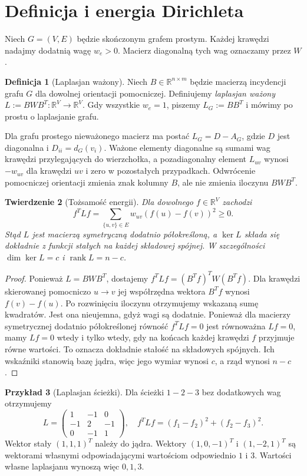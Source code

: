 \documentclass[11pt,a4paper]{report}
\numberwithin{equation}{section}
\theoremstyle{plain}
\newtheorem{twierdzenie}{Twierdzenie}[section]
\theoremstyle{definition}
\newtheorem{definicja}[twierdzenie]{Definicja}
\newtheorem{przyklad}[twierdzenie]{Przykład}
\theoremstyle{remark}
\begin{document}
\section{Definicja i energia Dirichleta}
\label{sec:tg-lap-definition}

Niech $G=(V,E)$ będzie skończonym grafem prostym.
Każdej krawędzi nadajmy dodatnią wagę $w_e>0$.
Macierz diagonalną tych wag oznaczamy przez $W$.

\begin{definicja}[Laplasjan ważony]
Niech $B\in\mathbb R^{n\times m}$ będzie macierzą incydencji
grafu $G$ dla dowolnej orientacji pomocniczej. Definiujemy
\emph{laplasjan ważony} $L:=BWB^T:\mathbb R^V\to\mathbb R^V$.
Gdy wszystkie $w_e=1$, piszemy $L_G:=BB^T$ i mówimy
po prostu o laplasjanie grafu.
\end{definicja}

Dla grafu prostego nieważonego macierz ma postać
$L_G=D-A_G$, gdzie $D$ jest diagonalna i $D_{ii}=d_G(v_i)$.
Ważone elementy diagonalne są sumami wag krawędzi
przylegających do wierzchołka, a pozadiagonalny element
$L_{uv}$ wynosi $-w_{uv}$ dla krawędzi $uv$ i zero w pozostałych
przypadkach. Odwrócenie pomocniczej orientacji zmienia znak
kolumny $B$, ale nie zmienia iloczynu $BWB^T$.

\begin{twierdzenie}[Tożsamość energii]
\label{thm:tg-energy}
Dla dowolnego $f\in\mathbb R^V$ zachodzi
\[
f^TLf=\sum_{\{u,v\}\in E}w_{uv}(f(u)-f(v))^2\ge0.
\]
Stąd $L$ jest macierzą symetryczną dodatnio półokreśloną, a
$\ker L$ składa się dokładnie z funkcji stałych na każdej
składowej spójnej. W szczególności $\dim\ker L=c$ i
$\operatorname{rank}L=n-c$.
\end{twierdzenie}

\begin{proof}
Ponieważ $L=BWB^T$, dostajemy
$f^TLf=(B^Tf)^TW(B^Tf)$. Dla krawędzi skierowanej
pomocniczo $u\to v$ jej współrzędna wektora $B^Tf$
wynosi $f(v)-f(u)$. Po rozwinięciu iloczynu otrzymujemy
wskazaną sumę kwadratów. Jest ona nieujemna, gdyż wagi są
dodatnie. Ponieważ dla macierzy symetrycznej dodatnio
półokreślonej równość $f^TLf=0$ jest równoważna
$Lf=0$, mamy $Lf=0$ wtedy i tylko wtedy, gdy na
końcach każdej krawędzi $f$ przyjmuje równe wartości.
To oznacza dokładnie stałość na składowych spójnych.
Ich wskaźniki stanowią bazę jądra, więc jego wymiar wynosi
$c$, a rząd wynosi $n-c$.
\end{proof}

\begin{przyklad}[Laplasjan ścieżki]
Dla ścieżki $1-2-3$ bez dodatkowych wag otrzymujemy
\[
L=\begin{pmatrix}1&-1&0\\-1&2&-1\\0&-1&1\end{pmatrix},
\quad
f^TLf=(f_1-f_2)^2+(f_2-f_3)^2.
\]
Wektor stały $(1,1,1)^T$ należy do jądra.
Wektory $(1,0,-1)^T$ i $(1,-2,1)^T$ są wektorami własnymi
odpowiadającymi wartościom odpowiednio $1$ i $3$.
Wartości własne laplasjanu wynoszą więc $0,1,3$.
\end{przyklad}
\end{document}
